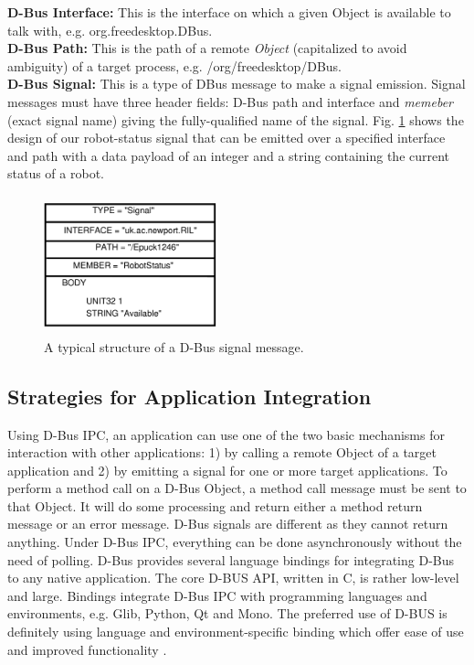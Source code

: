 \documentclass[draft]{ifacconf}
\begin{document}
\textbf{D-Bus Interface: }
This is the interface on which a given Object is available to talk with, e.g. org.freedesktop.DBus.\\
\textbf{D-Bus Path: }
This is the path of a remote \textit{Object} (capitalized to avoid ambiguity) of a target process, e.g. /org/freedesktop/DBus.\\
\textbf{D-Bus Signal: }
This is a type of DBus message to make a signal emission. Signal messages must have three header fields: D-Bus path and interface and {\em memeber} (exact signal name) giving the fully-qualified name of the signal. Fig. \ref{fig:dbus-signal-protocol}  shows the design of our robot-status signal that can be emitted over a specified interface and path with a data payload of an integer and a string containing the current status of a robot.
\begin{figure}
\begin{center}
\includegraphics[width=5cm,height=4cm]{./dia-files/dbus-signal-protocol} %
\caption{A typical structure of a D-Bus signal message.} 
\label{fig:dbus-signal-protocol}
\end{center}
\end{figure}
\subsection{Strategies for Application Integration}
Using D-Bus IPC, an application can use one of the two basic mechanisms for interaction with other applications: 1) by calling a remote Object of a target application and 2) by emitting a signal for one or more target applications. To perform a method call on a D-Bus Object, a method call message must be sent to that Object. It will do some processing and return either a method return message or an error message. D-Bus signals are different as they cannot return anything. Under D-Bus IPC, everything can be done asynchronously without the need of polling.
D-Bus provides several language bindings for integrating D-Bus to any native application. The core D-BUS API, written in C, is rather low-level and large. Bindings integrate D-Bus IPC with programming languages and environments, e.g. Glib, Python, Qt and Mono. The preferred use of D-BUS is definitely using language and environment-specific binding which offer ease of use and improved functionality \citep{Love2005}.
\end{document}
